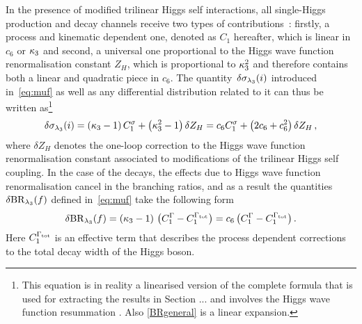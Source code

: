 In the presence of modified trilinear Higgs self interactions, all single-Higgs production and decay channels receive two types of contributions~\cite{Gorbahn:2016uoy,Degrassi:2016wml}: firstly, a process and kinematic dependent one, denoted as $C_1$ hereafter, which is linear in $c_6$ or $\kappa_{3}$ and second, a universal one proportional to the Higgs wave function renormalisation constant $Z_H$, which is proportional to $\kappa_{3}^2$ and therefore contains both a linear and quadratic piece  in $c_6$. The quantity~$\delta \sigma_{\lambda_{3}}(i)$ introduced in~\eqref{eq:muf} as well as any differential distribution related to it can thus be written as\footnote{This equation is in reality a linearised version of the complete formula that is used for extracting the results in Section ... and involves the Higgs wave function resummation \cite{Degrassi:2016wml,Maltoni:2017ims}. Also \eqref{BRgeneral} is a linear expansion. } 
\begin{equation} \label{dsigmakt}
\delta \sigma_{\lambda_{3}}(i)  = \left ( \kappa_3 - 1\right ) C_1^{\sigma}  + \left ( \kappa_3^2 - 1\right ) \delta Z_H = c_6 C_1^{\sigma} +  \left ( 2 c_6 + c_6^2 \right )  \delta Z_H \,, 
\end{equation}
where $\delta Z_H$ denotes the one-loop correction to the Higgs wave function renormalisation constant associated to modifications of the trilinear Higgs self coupling. In the case of the decays, the effects due to  Higgs wave function renormalisation cancel in the branching ratios, and as a result the quantities $\delta {\rm BR}_{\lambda_{3}} (f)$ defined in~\eqref{eq:muf} take the following form 
\begin{equation}
\delta {\rm BR}_{\lambda_{3}}(f)  =   \left ( \kappa_3 - 1\right )  \, \big (C_1^{\Gamma}-C_1^{\Gamma_{\rm tot}} \big ) = c_6 \, \big (C_1^{\Gamma}-C_1^{\Gamma_{\rm tot}} \big )  \,.
\label{BRgeneral} 
\end{equation}
Here $C_1^{\Gamma_{\rm tot}}$ is an effective term that describes the process dependent  corrections to the total decay width of the Higgs boson. 

